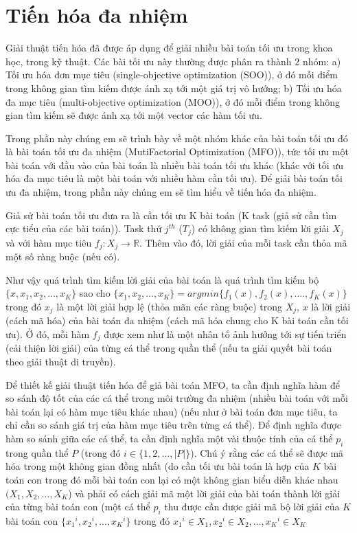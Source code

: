 \documentclass[a4paper,12pt]{report}
\begin{document}
\section{Tiến hóa đa nhiệm}
Giải thuật tiến hóa đã được áp dụng để giải nhiều bài toán tối ưu trong khoa học, trong kỹ thuật. Các bài tối ưu này thường được phân ra thành 2 nhóm: a) Tối ưu hóa đơn mục tiêu (single-objective optimization (SOO)), ở đó mỗi điểm trong không gian tìm kiếm được ánh xạ tới một giá trị vô hướng; b) Tối ưu hóa đa mục tiêu (multi-objective optimization (MOO)), ở đó mỗi điểm trong không gian tìm kiếm sẽ được ánh xạ tới một vector các hàm tối ưu. 
\par Trong phần này chúng em sẽ trình bày về một nhóm khác của bài toán tối ưu đó là bài toán tối ưu đa nhiệm (MutiFactorial Optimization (MFO)), tức tối ưu một bài toán với đầu vào của bài toán là nhiều bài toán tối ưu khác (khác với tối ưu hóa đa mục tiêu là một bài toán với nhiều hàm cần tối ưu). Để giải bài toán tối ưu đa nhiệm, trong phần này chúng em sẽ tìm hiểu về tiến hóa đa nhiệm.
\par Giả sử bài toán tối ưu đưa ra là cần tối ưu K bài toán (K task (giả sử cần tìm cực tiểu của các bài toán)). Task thứ $j^{th}$ ($T_j$) có không gian tìm kiếm lời giải $X_j$ và với hàm mục tiêu $f_j: X_j \rightarrow \mathbb{R}$. Thêm vào đó, lời giải của mỗi task cần thỏa mã một số ràng buộc (nếu có).
\par Như vậy quá trình tìm kiếm lời giải của bài toán là quá trình tìm kiếm bộ $\{x, x_1, x_2 ,..., x_K\}$ sao cho $\{x_1, x_2, ..., x_K\} = argmin \{f_1(x), f_2(x), ...., f_K(x)\}$ trong đó $x_j$ là một lời giải hợp lệ (thỏa mãn các ràng buộc) trong $X_j$, $x$ là lời giải (cách mã hóa) của bài toán đa nhiệm (cách mã hóa chung cho K bài toán cần tối ưu). Ở đó, mỗi hàm $f_j$ được xem như là một nhân tố ảnh hưởng tới sự tiến triển (cải thiện lời giải) của từng cá thể trong quần thể (nếu ta giải quyết bài toán theo giải thuật di truyền).
\par Để thiết kế giải thuật tiến hóa để giả bài toán MFO, ta cần định nghĩa hàm để so sánh độ tốt của các cá thể trong môi trường đa nhiệm (nhiều bài toán với mỗi bài toán lại có hàm mục tiêu khác nhau) (nếu như ở bài toán đơn mục tiêu, ta chỉ cần so sánh giá trị của hàm mục tiêu trên từng cá thể). Để định nghĩa được hàm so sánh giữa các cá thể, ta cần định nghĩa một vài thuộc tính của cá thể $p_i$ trong quần thể $P$ (trong đó $i \in \{1, 2, ..., |P|\}$). Chú ý rằng các cá thể sẽ được mã hóa trong một không gian đồng nhất (do cần tối ưu bài toán là hợp của $K$ bài toán con trong đó mỗi bài toán con lại có một không gian biểu diễn khác nhau $(X_1, X_2, ..., X_K$) và phải có cách giải mã một lời giải của bài toán thành lời giải của từng bài toán con (một cá thể $p_i$ thu được cần được giải mã bộ lời giải của $K$ bài toán con $\{{x_1}^i, {x_2}^i, ..., {x_K}^i\}$ trong đó ${x_1}^i \in X_1, {x_2}^i \in X_2, ..., {x_K}^i \in X_K$
\end{document}
